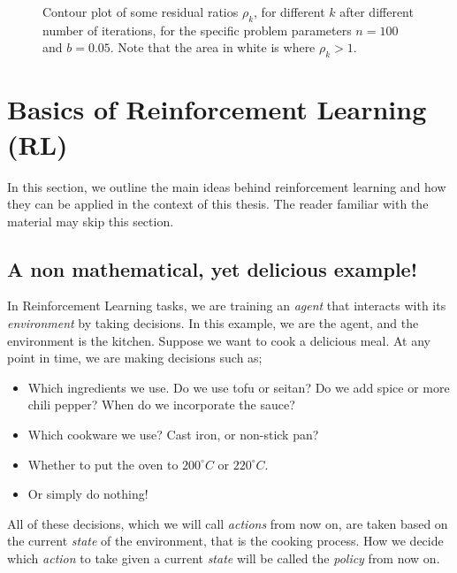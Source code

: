 \documentclass[
  letterpaper,
]{report}
\providecommand{\tightlist}{%
  \setlength{\itemsep}{0pt}\setlength{\parskip}{0pt}}\usepackage{longtable,booktabs,array}
\theoremstyle{plain}
\theoremstyle{definition}
\theoremstyle{definition}
\theoremstyle{remark}
\begin{document}
\begin{figure}
\begin{minipage}[t]{0.50\linewidth}
{{}

}

\end{minipage}%

\caption{\label{fig-res_ratio_comparison}Contour plot of some residual
ratios \(\rho_k\), for different \(k\) after different number of
iterations, for the specific problem parameters \(n = 100\) and
\(b=0.05\). Note that the area in white is where \(\rho_k > 1\).}

\end{figure}


\hypertarget{basics-of-reinforcement-learning-rl}{%
\chapter{Basics of Reinforcement Learning
(RL)}\label{basics-of-reinforcement-learning-rl}}

In this section, we outline the main ideas behind reinforcement learning
and how they can be applied in the context of this thesis. The reader
familiar with the material may skip this section.

\hypertarget{a-non-mathematical-yet-delicious-example}{%
\section{A non mathematical, yet delicious
example!}\label{a-non-mathematical-yet-delicious-example}}

In Reinforcement Learning tasks, we are training an \emph{agent} that
interacts with its \emph{environment} by taking decisions. In this
example, we are the agent, and the environment is the kitchen. Suppose
we want to cook a delicious meal. At any point in time, we are making
decisions such as;

\begin{itemize}
\tightlist
\item
  Which ingredients we use. Do we use tofu or seitan? Do we add spice or
  more chili pepper? When do we incorporate the sauce?
\item
  Which cookware we use? Cast iron, or non-stick pan?
\item
  Whether to put the oven to \(200^\circ C\) or \(220^\circ C\).
\item
  Or simply do nothing!
\end{itemize}

All of these decisions, which we will call \emph{actions} from now on,
are taken based on the current \emph{state} of the environment, that is
the cooking process. How we decide which \emph{action} to take given a
current \emph{state} will be called the \emph{policy} from now on.
\end{document}
